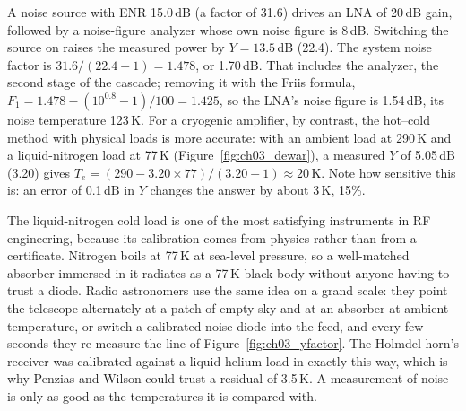 

\begin{worked}
A noise source with ENR 15.0\,dB (a factor of 31.6) drives an LNA of 20\,dB gain, followed by a
noise-figure analyzer whose own noise figure is 8\,dB. Switching the source on raises the measured power by
$Y=13.5$\,dB (22.4). The system noise factor is $31.6/(22.4-1)=1.478$, or 1.70\,dB. That includes the
analyzer, the second stage of the cascade; removing it with the Friis formula,
$F_1=1.478-(10^{0.8}-1)/100=1.425$, so the LNA's noise figure is 1.54\,dB, its noise temperature 123\,K.
For a cryogenic amplifier, by contrast, the hot--cold method with physical loads is more accurate: with an
ambient load at 290\,K and a liquid-nitrogen load at 77\,K (Figure~\ref{fig:ch03_dewar}), a measured $Y$ of
5.05\,dB (3.20) gives $T_e=(290-3.20\times77)/(3.20-1)\approx20$\,K. Note how sensitive this is: an error of
0.1\,dB in $Y$ changes the answer by about 3\,K, 15\%.
\end{worked}

The liquid-nitrogen cold load is one of the most satisfying instruments in RF engineering, because its
calibration comes from physics rather than from a certificate. Nitrogen boils at 77\,K at sea-level
pressure, so a well-matched absorber immersed in it radiates as a 77\,K black body without anyone having to
trust a diode. Radio astronomers use the same idea on a grand scale: they point the telescope alternately
at a patch of empty sky and at an absorber at ambient temperature, or switch a calibrated noise diode into
the feed, and every few seconds they re-measure the line of Figure~\ref{fig:ch03_yfactor}. The Holmdel
horn's receiver was calibrated against a liquid-helium load in exactly this way, which is why Penzias and
Wilson could trust a residual of 3.5\,K. A measurement of noise is only as good as the temperatures it is
compared with.

